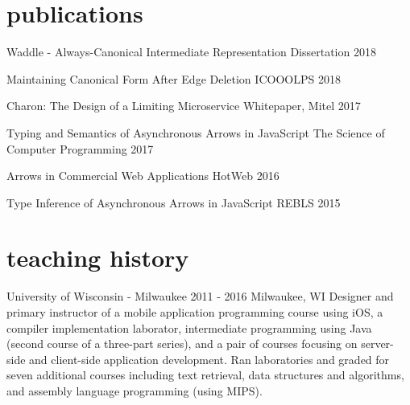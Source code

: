 \documentclass[]{clean-resume}
\begin{document}
\section{publications}

\shortentry
  {Waddle - Always-Canonical Intermediate Representation}
  {Dissertation}
  {2018}
  
\shortentry
  {Maintaining Canonical Form After Edge Deletion}
  {ICOOOLPS}
  {2018}

\shortentry
  {Charon: The Design of a Limiting Microservice}
  {Whitepaper, Mitel}
  {2017}

\shortentry
  {Typing and Semantics of Asynchronous Arrows in JavaScript}
  {The Science of Computer Programming}
  {2017}
  
\shortentry
  {Arrows in Commercial Web Applications}
  {HotWeb}
  {2016}
  
\shortentry
  {Type Inference of Asynchronous Arrows in JavaScript}
  {REBLS}
  {2015}

\section{teaching history}

\entry
  {University of Wisconsin - Milwaukee}
  {}
  {2011 - 2016}
  {Milwaukee, WI}
  {
    Designer and primary instructor of a mobile application programming course using iOS, a compiler implementation laborator, intermediate programming using Java (second course of a three-part series), and a pair of courses focusing on server-side and client-side application development. Ran laboratories and graded for seven additional courses including text retrieval, data structures and algorithms, and assembly language programming (using MIPS).
  }
\end{document}

